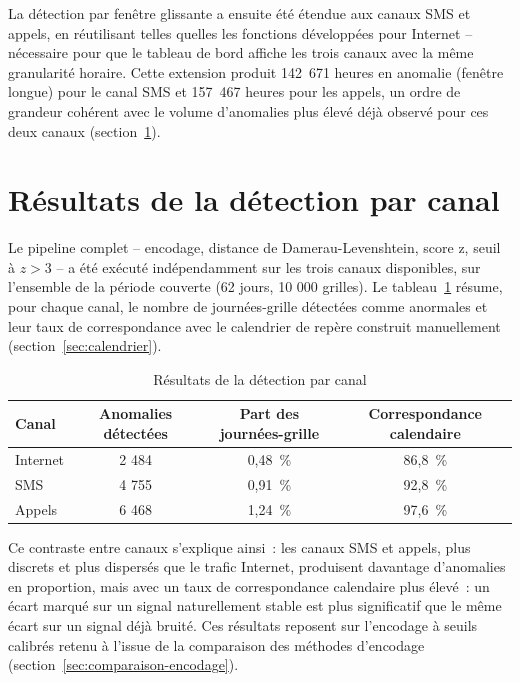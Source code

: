 La détection par fenêtre glissante a ensuite été étendue aux canaux
SMS et appels, en réutilisant telles quelles les fonctions développées
pour Internet -- nécessaire pour que le tableau de bord affiche les
trois canaux avec la même granularité horaire. Cette extension produit
142~671 heures en anomalie (fenêtre longue) pour le canal SMS et
157~467 heures pour les appels, un ordre de grandeur cohérent avec le
volume d'anomalies plus élevé déjà observé pour ces deux canaux
(section~\ref{sec:resultats-canal}).

\section{Résultats de la détection par canal}
\label{sec:resultats-canal}

Le pipeline complet -- encodage, distance de Damerau-Levenshtein,
score z, seuil à $z>3$ -- a été exécuté indépendamment sur les trois
canaux disponibles, sur l'ensemble de la période couverte (62 jours,
10 000 grilles). Le tableau~\ref{tab:resultats-canal} résume, pour
chaque canal, le nombre de journées-grille détectées comme anormales
et leur taux de correspondance avec le calendrier de repère construit
manuellement (section~\ref{sec:calendrier}).

\begin{table}[htbp]
  \centering
  \caption{Résultats de la détection par canal}
  \label{tab:resultats-canal}
  \begin{tabular}{lccc}
    \toprule
    \textbf{Canal} & \textbf{Anomalies détectées} & \textbf{Part des journées-grille} & \textbf{Correspondance calendaire} \\
    \midrule
    Internet & 2 484 & 0,48~\% & 86,8~\% \\
    SMS      & 4 755 & 0,91~\% & 92,8~\% \\
    Appels   & 6 468 & 1,24~\% & 97,6~\% \\
    \bottomrule
  \end{tabular}
\end{table}

Ce contraste entre canaux s'explique ainsi~: les canaux SMS et appels,
plus discrets et plus dispersés que le trafic Internet, produisent
davantage d'anomalies en proportion, mais avec un taux de
correspondance calendaire plus élevé~: un écart marqué sur un signal
naturellement stable est plus significatif que le même écart sur un
signal déjà bruité. Ces résultats reposent sur l'encodage à seuils
calibrés retenu à l'issue de la comparaison des méthodes d'encodage
(section~\ref{sec:comparaison-encodage}).

